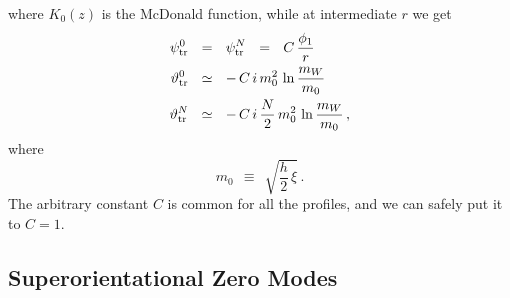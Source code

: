 \documentclass[12pt]{article}
\newcommand{\pts}{\psi_{\rm tr}^0}
\newcommand{\ptN}{\psi_{\rm tr}^N}
\newcommand{\tts}{\vartheta_{\rm tr}^0}
\newcommand{\ttN}{\vartheta_{\rm tr}^N}
\begin{document}
	where $ K_0(z) $ is the McDonald function, 
	while at intermediate $ r $ we get
\begin{align*}
%
	\pts & ~~=~~ \ptN ~~=~~ C\,\frac{\phi_1}{r}
	\\
%
	\tts & ~~\simeq~~ -\,C\,i\,m_0^2\,\ln\frac{m_W}{m_0}
	\\
%
	\ttN & ~~\simeq~~ -\,C\,i\,\frac{N}{2}\,m_0^2\,\ln\frac{m_W}{m_0}\,,
\end{align*}
where 
\[
	m_0 ~~\equiv~~ \sqrt{\frac{h}{2}\, \xi}\,.
\]
	The arbitrary constant $ C $ is common for all the profiles, and we can safely put
	it to $ C = 1 $.


\subsection{Superorientational Zero Modes}
\end{document}
